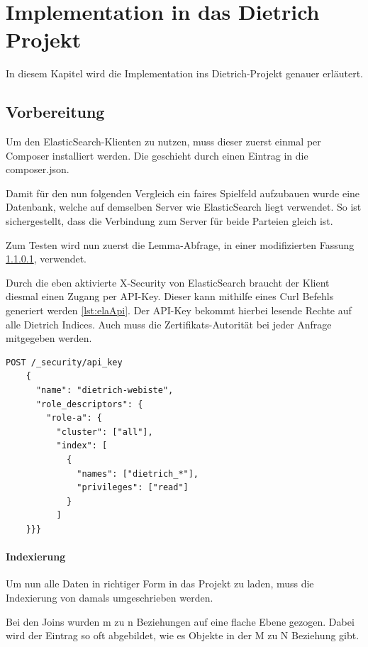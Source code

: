 \chapter{Implementation in das Dietrich Projekt}

In diesem Kapitel wird die Implementation ins Dietrich-Projekt genauer erläutert.

\section{Vorbereitung}

Um den ElasticSearch-Klienten zu nutzen, muss dieser zuerst einmal per Composer installiert werden. Die geschieht durch einen Eintrag in die composer.json.

Damit für den nun folgenden Vergleich ein faires Spielfeld aufzubauen wurde eine Datenbank, welche auf demselben Server wie ElasticSearch liegt verwendet. So ist sichergestellt, dass die Verbindung zum Server für beide Parteien gleich ist.

Zum Testen wird nun zuerst die Lemma-Abfrage, in einer modifizierten Fassung \ref{lemmaIndexierungEla}, verwendet.

Durch die eben aktivierte X-Security von ElasticSearch braucht der Klient diesmal einen Zugang per API-Key. Dieser kann mithilfe eines Curl Befehls generiert werden \ref{lst:elaApi}. Der API-Key bekommt hierbei lesende Rechte auf alle Dietrich Indices. Auch muss die Zertifikats-Autorität bei jeder Anfrage mitgegeben werden. 

\begin{lstlisting}[language=XML, frame=single, label={lst:elaApi}] 
    POST /_security/api_key
    {
      "name": "dietrich-webiste",
      "role_descriptors": { 
        "role-a": {
          "cluster": ["all"],
          "index": [
            {
              "names": ["dietrich_*"],
              "privileges": ["read"]
            }
          ]
    }}}
\end{lstlisting}


\subsubsection{Indexierung}
\label{lemmaIndexierungEla}

Um nun alle Daten in richtiger Form in das Projekt zu laden, muss die Indexierung von damals umgeschrieben werden. 

Bei den Joins wurden m zu n Beziehungen auf eine flache Ebene gezogen. Dabei wird der Eintrag so oft abgebildet, wie es Objekte in der M zu N Beziehung gibt. 

